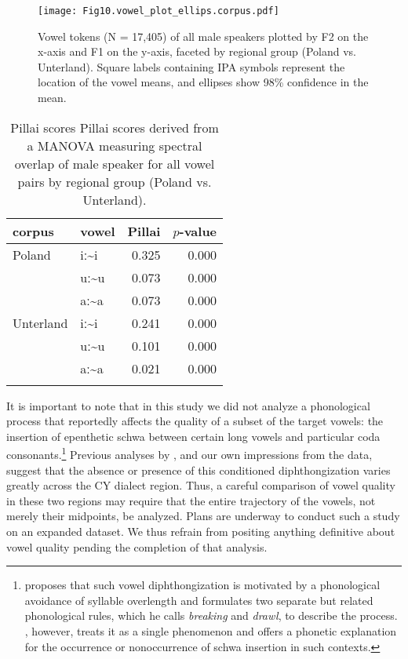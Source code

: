 \documentclass[output=paper,colorlinks,citecolor=brown]{langscibook}
\begin{document}
\begin{figure}
\texttt{[image: Fig10.vowel\_plot\_ellips.corpus.pdf]}
\caption{\label{fig:nove:10} Vowel tokens (N = 17,405) of all male speakers plotted by F2 on the x-axis and F1 on the y-axis, faceted by regional group (Poland vs. Unterland). Square labels containing IPA symbols represent the location of the vowel means, and ellipses show 98\% confidence in the mean.}
\end{figure}

\begin{table}
\begin{tabularx}{.8\textwidth}{XXrr}
\lsptoprule
{ corpus} & { vowel} & { Pillai} & { $p$-value}\\
\midrule
Poland & iː{\textasciitilde}i & 0.325 & 0.000\\
& uː{\textasciitilde}u & 0.073 & 0.000\\
& aː{\textasciitilde}a & 0.073 & 0.000\\
Unterland & iː{\textasciitilde}i & 0.241 & 0.000\\
& uː{\textasciitilde}u & 0.101 & 0.000\\
& aː{\textasciitilde}a & 0.021 & 0.000\\
\lspbottomrule
\end{tabularx}
\caption{\label{tab:nove:7} Pillai scores Pillai scores derived from a MANOVA measuring spectral overlap of male speaker for all vowel pairs by regional group (Poland vs. Unterland).}
\end{table}

It is important to note that in this study we did not analyze a phonological process that reportedly affects the quality of a subset of the target vowels: the insertion of epenthetic schwa between certain long vowels and particular coda consonants.\footnote{\citet{Jacobs1993} proposes that such vowel diphthongization is motivated by a phonological avoidance of syllable overlength and formulates two separate but related phonological rules, which he calls \textit{breaking} and \textit{drawl}, to describe the process. \citet{Garellek2020}, however, treats it as a single phenomenon and offers a phonetic explanation for the occurrence or nonoccurrence of schwa insertion in such contexts.}  Previous analyses by \citet{Nove2021}, and our own impressions from the data, suggest that the absence or presence of this conditioned diphthongization varies greatly across the CY dialect region. Thus, a careful comparison of vowel quality in these two regions may require that the entire trajectory of the vowels, not merely their midpoints, be analyzed. Plans are underway to conduct such a study on an expanded dataset. We thus refrain from positing anything definitive about vowel quality pending the completion of that analysis. 
\end{document}
